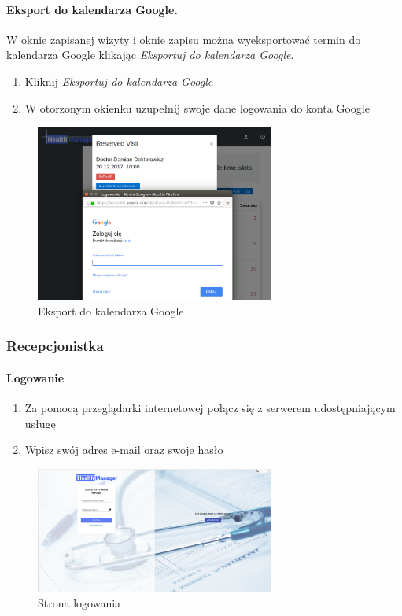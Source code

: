 \documentclass[polish,12pt]{aghthesis}
\begin{document}
    \paragraph{Eksport do kalendarza Google.}{ W oknie zapisanej wizyty i oknie zapisu można wyeksportować termin do kalendarza Google klikając \emph{Eksportuj do kalendarza Google}.
    \begin{enumerate}
      \item Kliknij \emph{Eksportuj do kalendarza Google}
      \item W otorzonym okienku uzupełnij swoje dane logowania do konta Google
    \end{enumerate}
       \begin{figure}[H]
        \includegraphics[width=0.7\textwidth]{gui-google-export}
        \caption{Eksport do kalendarza Google}
        \end{figure}  
    }
\subsubsection{Recepcjonistka}
    \paragraph{Logowanie}{
      \begin{enumerate}
          \item Za pomocą przeglądarki internetowej połącz się z serwerem udostępniającym usługę
          \item Wpisz swój adres e-mail oraz swoje hasło
      \end{enumerate}
      \begin{figure}[H]
          \includegraphics[width=0.7\textwidth]{gui-loginpage}
          \caption{Strona logowania}
      \end{figure}
    }
\end{document}
